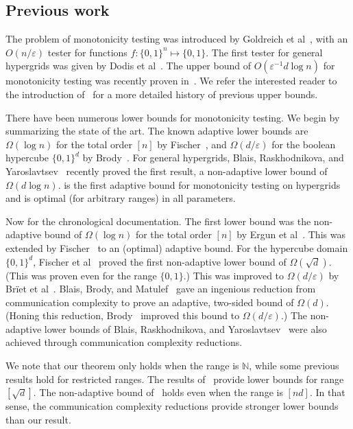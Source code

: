 \documentclass[11pt]{article}
\def\eps{\varepsilon}
\newcommand{\NN}{\mathbb{N}}
\begin{document}
\subsection{Previous work} \label{sec:prev}

The problem of monotonicity testing was introduced by Goldreich et al~\cite{GGLRS00}, with an $O(n/\eps)$
tester for functions $f:\{0,1\}^n \mapsto \{0,1\}$. The first tester for general hypergrids was given
by Dodis et al~\cite{DGLRRS99}. The upper bound of $O(\eps^{-1} d\log n)$ for monotonicity testing was recently proven
in~\cite{ChSe13}. We refer the interested reader to the introduction of~\cite{ChSe13} for a more detailed history of previous upper bounds.

There have been numerous lower bounds for monotonicity testing. We begin by summarizing the state of the art.
The known adaptive lower bounds are $\Omega(\log n)$ for the total order $[n]$ by Fischer~\cite{E04},
and $\Omega(d/\eps)$ for the boolean hypercube $\{0,1\}^d$ by Brody~\cite{Br13}. For general hypergrids,
Blais, Raskhodnikova, and Yaroslavtsev~\cite{BlJh+12} recently proved the first result, a non-adaptive lower bound of $\Omega(d\log n)$.
 is the first adaptive bound for monotonicity testing on hypergrids and is optimal (for arbitrary ranges) in all parameters.


Now for the chronological documentation. The first lower bound was the non-adaptive bound of $\Omega(\log n)$ for the total order $[n]$ by Ergun et al~\cite{EKK+00}.
This was extended by Fischer~\cite{E04} to an (optimal) adaptive bound. For the hypercube domain $\{0,1\}^d$,
Fischer et al~\cite{FLNRRS02} proved the first non-adaptive lower bound of $\Omega(\sqrt{d})$. (This was proven
even for the range $\{0,1\}$.) This was improved to $\Omega(d/\eps)$ by Br\"{i}et et al~\cite{BCG+10}.
Blais, Brody, and Matulef~\cite{BBM11} gave an ingenious reduction from communication complexity
to prove an adaptive, two-sided bound of $\Omega(d)$. (Honing this reduction, Brody~\cite{Br13} improved this bound to $\Omega(d/\eps)$.)
The non-adaptive lower bounds of Blais, Raskhodnikova, and Yaroslavtsev~\cite{BlJh+12} were also achieved
through communication complexity reductions.

We note that our theorem only holds when the range is $\NN$, while some previous results hold for restricted
ranges. The results of~\cite{BBM11, Br13} provide lower bounds for range $[\sqrt{d}]$.
The non-adaptive bound of~\cite{BlJh+12} holds even when the range is $[nd]$. In that sense,
the communication complexity reductions provide stronger lower bounds than our result.
\end{document}
